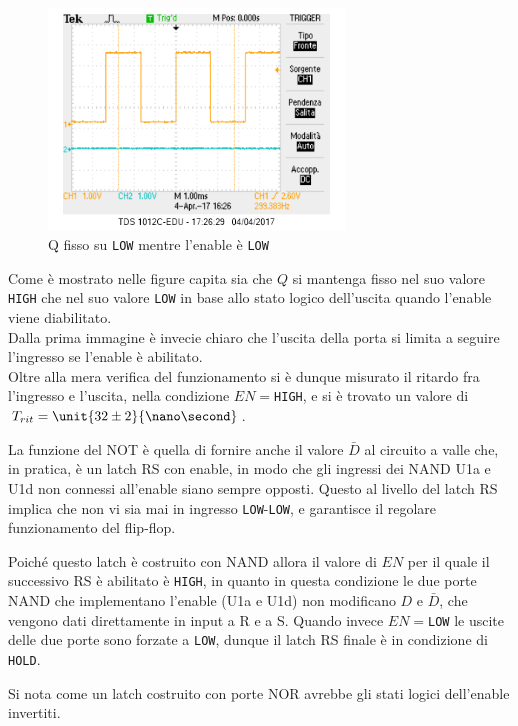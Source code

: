\documentclass[a4paper,10pt]{article}
\def\code#1{\texttt{#1}}
\begin{document}
\begin{figure}[H]
	\centering
	\includegraphics[width=0.7\textwidth]{../grafici/EnableDown1.png}
	\caption{Q fisso su \code{LOW} mentre l'enable è \code{LOW}}
	\label{fig:FFD}
\end{figure}

Come è mostrato nelle figure capita sia che $Q$ si mantenga fisso nel suo valore \code{HIGH} che nel suo valore \code{LOW} in base allo stato logico dell'uscita quando l'enable viene diabilitato.\\
Dalla prima immagine è invecie chiaro che l'uscita della porta si limita a seguire l'ingresso se l'enable è abilitato.\\
Oltre alla mera verifica del funzionamento si è dunque misurato il ritardo fra l'ingresso e l'uscita, nella condizione $EN=$\code{HIGH}, e si è trovato un valore di $T_{rit}=\unit{32\pm 2 }{\nano\second}$.
\newline 

La funzione del NOT è quella di fornire anche il valore $\bar{D}$ al circuito a valle che, in pratica, è un latch RS con enable, in modo che gli ingressi dei NAND U1a e U1d non connessi all'enable siano sempre opposti. Questo al livello del latch RS implica che non vi sia mai in ingresso \code{LOW}-\code{LOW}, e garantisce il regolare funzionamento del flip-flop.
 
Poiché questo latch è costruito con NAND allora il valore di $EN$ per il quale il successivo RS è abilitato è \code{HIGH}, in quanto in questa condizione le due porte NAND che implementano l'enable (U1a e U1d) non modificano $D$ e $\bar{D}$, che vengono dati direttamente in input a R e a S. Quando invece $EN=$\code{LOW} le uscite delle due porte sono forzate a \code{LOW}, dunque il latch RS finale è in condizione di \code{HOLD}.

Si nota come un latch costruito con porte NOR avrebbe gli stati logici dell'enable invertiti.
\end{document}
